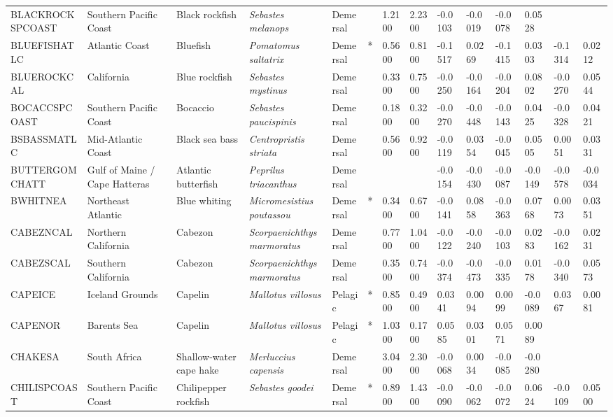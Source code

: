 \begin{longtable}{p{2.8cm}p{2cm}p{1.7cm}p{1.7cm}p{1cm}p{0.3cm}p{1cm}p{1cm}p{1cm}p{1cm}p{1cm}p{1cm}p{1cm}p{1cm}}
  BLACKROCKSPCOAST & Southern Pacific Coast & Black rockfish & \textit{Sebastes melanops} & Demersal &   & 1.2100 & 2.2300 & -0.0103 & -0.0019 & -0.0078 & 0.0528 &  &  \\ 
  BLUEFISHATLC & Atlantic Coast & Bluefish & \textit{Pomatomus saltatrix} & Demersal & * & 0.5600 & 0.8100 & -0.1517 & 0.0269 & -0.1415 & 0.0303 & -0.1314 & 0.0212 \\ 
  BLUEROCKCAL & California & Blue rockfish & \textit{Sebastes mystinus} & Demersal &   & 0.3300 & 0.7500 & -0.0250 & -0.0164 & -0.0204 & 0.0802 & -0.0270 & 0.0544 \\ 
  BOCACCSPCOAST & Southern Pacific Coast & Bocaccio & \textit{Sebastes paucispinis} & Demersal &   & 0.1800 & 0.3200 & -0.0270 & -0.0448 & -0.0143 & 0.0425 & -0.0328 & 0.0421 \\ 
  BSBASSMATLC & Mid-Atlantic Coast & Black sea bass & \textit{Centropristis striata} & Demersal &   & 0.5600 & 0.9200 & -0.0119 & 0.0354 & -0.0045 & 0.0505 & 0.0051 & 0.0331 \\ 
  BUTTERGOMCHATT & Gulf of Maine / Cape Hatteras & Atlantic butterfish & \textit{Peprilus triacanthus} & Demersal &  &  &  & -0.0154 & -0.0430 & -0.0087 & -0.0149 & -0.0578 & -0.0034 \\ 
  BWHITNEA & Northeast Atlantic & Blue whiting & \textit{Micromesistius poutassou} & Demersal & * & 0.3400 & 0.6700 & -0.0141 & 0.0858 & -0.0363 & 0.0768 & 0.0073 & 0.0351 \\ 
  CABEZNCAL & Northern California & Cabezon & \textit{Scorpaenichthys marmoratus} & Demersal &   & 0.7700 & 1.0400 & -0.0122 & -0.0240 & -0.0103 & 0.0283 & -0.0162 & 0.0231 \\ 
  CABEZSCAL & Southern California & Cabezon & \textit{Scorpaenichthys marmoratus} & Demersal &   & 0.3500 & 0.7400 & -0.0374 & -0.0473 & -0.0335 & 0.0178 & -0.0340 & 0.0573 \\ 
  CAPEICE & Iceland Grounds & Capelin & \textit{Mallotus villosus} & Pelagic & * & 0.8500 & 0.4900 & 0.0341 & 0.0094 & 0.0099 & -0.0089 & 0.0367 & 0.0081 \\ 
  CAPENOR & Barents Sea & Capelin & \textit{Mallotus villosus} & Pelagic & * & 1.0300 & 0.1700 & 0.0585 & 0.0301 & 0.0571 & 0.0089 &  &  \\ 
  CHAKESA & South Africa & Shallow-water cape hake & \textit{Merluccius capensis} & Demersal &   & 3.0400 & 2.3000 & -0.0068 & 0.0034 & -0.0085 & -0.0280 &  &  \\ 
  CHILISPCOAST & Southern Pacific Coast & Chilipepper rockfish & \textit{Sebastes goodei} & Demersal & * & 0.8900 & 1.4300 & -0.0090 & -0.0062 & -0.0072 & 0.0624 & -0.0109 & 0.0500 \\ 

\end{longtable}
